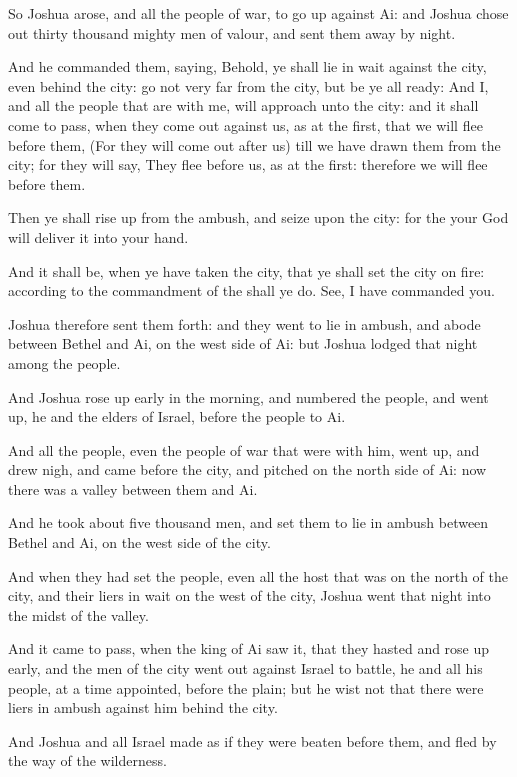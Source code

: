 \Verse So Joshua arose, and all the people of war, to go up against Ai: and Joshua chose out thirty thousand mighty men of valour, and sent them away by night.

\Verse And he commanded them, saying, Behold, ye shall lie in wait against the city, even behind the city: go not very far from the city, but be ye all ready: \Verse And I, and all the people that are with me, will approach unto the city: and it shall come to pass, when they come out against us, as at the first, that we will flee before them, \Verse (For they will come out after us) till we have drawn them from the city; for they will say, They flee before us, as at the first: therefore we will flee before them.

\Verse Then ye shall rise up from the ambush, and seize upon the city: for the \LORD your God will deliver it into your hand.

\Verse And it shall be, when ye have taken the city, that ye shall set the city on fire: according to the commandment of the \LORD shall ye do. See, I have commanded you.

\Verse Joshua therefore sent them forth: and they went to lie in ambush, and abode between Bethel and Ai, on the west side of Ai: but Joshua lodged that night among the people.

\Verse And Joshua rose up early in the morning, and numbered the people, and went up, he and the elders of Israel, before the people to Ai.

\Verse And all the people, even the people of war that were with him, went up, and drew nigh, and came before the city, and pitched on the north side of Ai: now there was a valley between them and Ai.

\Verse And he took about five thousand men, and set them to lie in ambush between Bethel and Ai, on the west side of the city.

\Verse And when they had set the people, even all the host that was on the north of the city, and their liers in wait on the west of the city, Joshua went that night into the midst of the valley.

\Verse And it came to pass, when the king of Ai saw it, that they hasted and rose up early, and the men of the city went out against Israel to battle, he and all his people, at a time appointed, before the plain; but he wist not that there were liers in ambush against him behind the city.

\Verse And Joshua and all Israel made as if they were beaten before them, and fled by the way of the wilderness.

